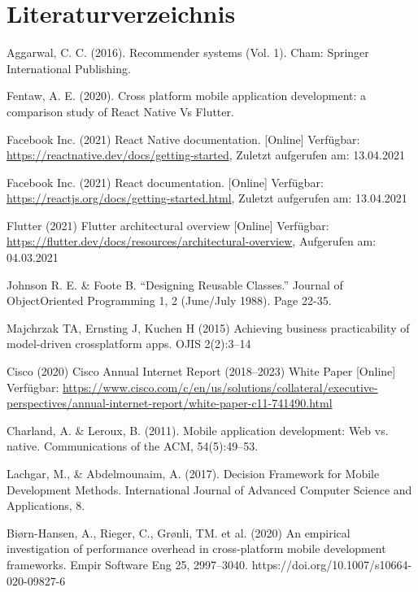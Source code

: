 \documentclass[11pt,a4paper]{article}
\begin{document}
\section*{Literaturverzeichnis}
\begin{itemize}
	 Aggarwal, C. C. (2016). Recommender systems (Vol. 1). Cham: Springer International Publishing.

	 Fentaw, A. E. (2020). Cross platform mobile application development: a comparison study of React Native Vs Flutter.

	 Facebook Inc. (2021) React Native documentation. [Online] Verfügbar: \url{https://reactnative.dev/docs/getting-started}, Zuletzt aufgerufen am: 13.04.2021

	 Facebook Inc. (2021) React documentation. [Online] Verfügbar: \url{https://reactjs.org/docs/getting-started.html}, Zuletzt aufgerufen am: 13.04.2021

	 Flutter (2021) Flutter architectural overview [Online] Verfügbar: \url{https://flutter.dev/docs/resources/architectural-overview}, Aufgerufen am: 04.03.2021

	 Johnson R. E. \&  Foote B. “Designing Reusable Classes.” Journal of ObjectOriented Programming 1, 2 (June/July 1988). Page 22-35.

	 Majchrzak TA, Ernsting J, Kuchen H (2015) Achieving business practicability of model-driven crossplatform apps. OJIS 2(2):3–14

	 Cisco (2020) Cisco Annual Internet Report (2018–2023) White Paper [Online] Verfügbar: \url{https://www.cisco.com/c/en/us/solutions/collateral/executive-perspectives/annual-internet-report/white-paper-c11-741490.html}

	 Charland, A. \& Leroux, B. (2011). Mobile application development: Web vs. native. Communications of the ACM, 54(5):49–53.

	 Lachgar, M., \& Abdelmounaim, A. (2017). Decision Framework for Mobile Development Methods. International Journal of Advanced Computer Science and Applications, 8.

	 Biørn-Hansen, A., Rieger, C., Grønli, TM. et al. (2020) An empirical investigation of performance overhead in cross-platform mobile development frameworks. Empir Software Eng 25, 2997–3040. https://doi.org/10.1007/s10664-020-09827-6


\end{itemize}
\end{document}
